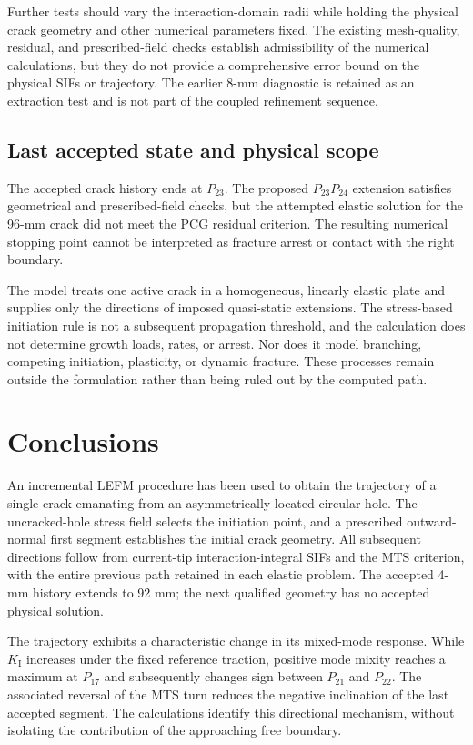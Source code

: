 \documentclass[pdflatex,sn-mathphys-num]{sn-jnl}
\begin{document}
Further tests should vary the interaction-domain radii while
holding the physical crack geometry and other numerical parameters
fixed. The existing mesh-quality, residual, and prescribed-field
checks establish admissibility of the numerical calculations, but
they do not provide a comprehensive error bound on the physical
SIFs or trajectory. The earlier 8-mm diagnostic is retained as
an extraction test and is not part of the coupled refinement
sequence.

\subsection{Last accepted state and physical scope}
The accepted crack history ends at $P_{23}$. The proposed
$P_{23}P_{24}$ extension satisfies geometrical and
prescribed-field checks, but the attempted elastic solution
for the 96-mm crack did not meet the PCG residual criterion.
The resulting numerical stopping point cannot be interpreted
as fracture arrest or contact with the right boundary.

The model treats one active crack in a homogeneous,
linearly elastic plate and supplies only the directions
of imposed quasi-static extensions. The stress-based
initiation rule is not a subsequent propagation threshold,
and the calculation does not determine growth loads,
rates, or arrest. Nor does it model branching, competing
initiation, plasticity, or dynamic fracture. These processes
remain outside the formulation rather than being ruled out
by the computed path.

\section{Conclusions}
\label{sec:conclusions}
An incremental LEFM procedure has been used to obtain the
trajectory of a single crack emanating from an asymmetrically
located circular hole. The uncracked-hole stress field selects
the initiation point, and a prescribed outward-normal first
segment establishes the initial crack geometry. All subsequent
directions follow from current-tip interaction-integral SIFs
and the MTS criterion, with the entire previous path retained
in each elastic problem. The accepted 4-mm history extends to
92 mm; the next qualified geometry has no accepted physical
solution.

The trajectory exhibits a characteristic change in its
mixed-mode response. While $K_{\mathrm{I}}$ increases under
the fixed reference traction, positive mode mixity reaches
a maximum at $P_{17}$ and subsequently changes sign
between $P_{21}$ and $P_{22}$. The associated reversal
of the MTS turn reduces the negative inclination of
the last accepted segment. The calculations identify
this directional mechanism, without isolating the
contribution of the approaching free boundary.
\end{document}
